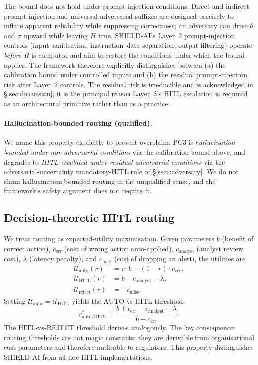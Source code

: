 \documentclass[preprint,12pt,authoryear]{elsarticle}
\begin{document}
The bound does not hold under prompt-injection conditions. Direct and indirect prompt injection \citep{liu2024formalizing,greshake2023indirect} and universal adversarial suffixes \citep{zou2023universal} are designed precisely to inflate apparent reliability while suppressing correctness; an adversary can drive $\theta$ and $\sigma$ upward while leaving $H$ true. SHIELD-AI's Layer~2 prompt-injection controls (input sanitisation, instruction--data separation, output filtering) operate \emph{before} $R$ is computed and aim to restore the conditions under which the bound applies. The framework therefore explicitly distinguishes between (a) the calibration bound under controlled inputs and (b) the residual prompt-injection risk after Layer~2 controls. The residual risk is irreducible and is acknowledged in §\ref{sec:discussion}; it is the principal reason Layer~3's HITL escalation is required as an architectural primitive rather than as a practice.

\paragraph{Hallucination-bounded routing (qualified).} We name this property explicitly to prevent overclaim: PC3 is \emph{hallucination-bounded under non-adversarial conditions} via the calibration bound above, and degrades to \emph{HITL-escalated under residual adversarial conditions} via the adversarial-uncertainty mandatory-HITL rule of §\ref{ssec:adversary}. We do not claim hallucination-bounded routing in the unqualified sense, and the framework's safety argument does not require it.

\subsection{Decision-theoretic HITL routing}
\label{ssec:hitl}
We treat routing as expected-utility maximisation. Given parameters $b$ (benefit of correct action), $c_{\text{err}}$ (cost of wrong action auto-applied), $c_{\text{analyst}}$ (analyst review cost), $\lambda$ (latency penalty), and $c_{\text{miss}}$ (cost of dropping an alert), the utilities are
\begin{align}
\mathcal{U}_{\text{auto}}(r) &= r \cdot b - (1 - r) \cdot c_{\text{err}}, \\
\mathcal{U}_{\text{HITL}}(r) &= b - c_{\text{analyst}} - \lambda, \\
\mathcal{U}_{\text{reject}}(r) &= - c_{\text{miss}}.
\end{align}
Setting $\mathcal{U}_{\text{auto}} = \mathcal{U}_{\text{HITL}}$ yields the AUTO-vs-HITL threshold:
\begin{equation}
r^*_{\text{auto/HITL}} = \frac{b + c_{\text{err}} - c_{\text{analyst}} - \lambda}{b + c_{\text{err}}}.
\label{eq:threshold}
\end{equation}
The HITL-vs-REJECT threshold derives analogously. The key consequence: routing thresholds are not magic constants; they are derivable from organisational cost parameters and therefore auditable to regulators. This property distinguishes SHIELD-AI from ad-hoc HITL implementations.
\end{document}
